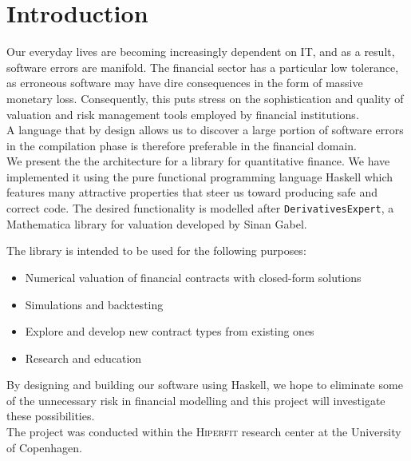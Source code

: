 \chapter{Introduction}

Our everyday lives are becoming increasingly dependent on IT, and as a result,
software errors are manifold. The financial sector has a particular low 
tolerance, as erroneous software may have dire consequences in the form of
massive monetary loss. Consequently, this puts stress on the sophistication and 
quality of valuation and risk management tools employed by financial institutions.\\
A language that by design allows us to discover a large portion of software
errors in the compilation phase is therefore preferable in the financial domain.\\

We present the the architecture for a library for quantitative finance. We have
implemented it using the pure functional programming language Haskell which
features many attractive properties that steer us toward producing safe and
correct code. The desired functionality is modelled after
{\tt DerivativesExpert}\cite{Mathematica:DerivativesExpert},
a Mathematica\cite{mathematica} library for valuation developed by Sinan Gabel.

The library is intended to be used for the following purposes:

\begin{itemize}
\item Numerical valuation of financial contracts with closed-form solutions
\item Simulations and backtesting
\item Explore and develop new contract types from existing ones
\item Research and education
\end{itemize}

By designing and building our software using Haskell, we hope to eliminate 
some of the unnecessary risk in financial modelling and this project
will investigate these possibilities.\\

The project was conducted within the \textsc{Hiperfit} research center at the
University of Copenhagen.
